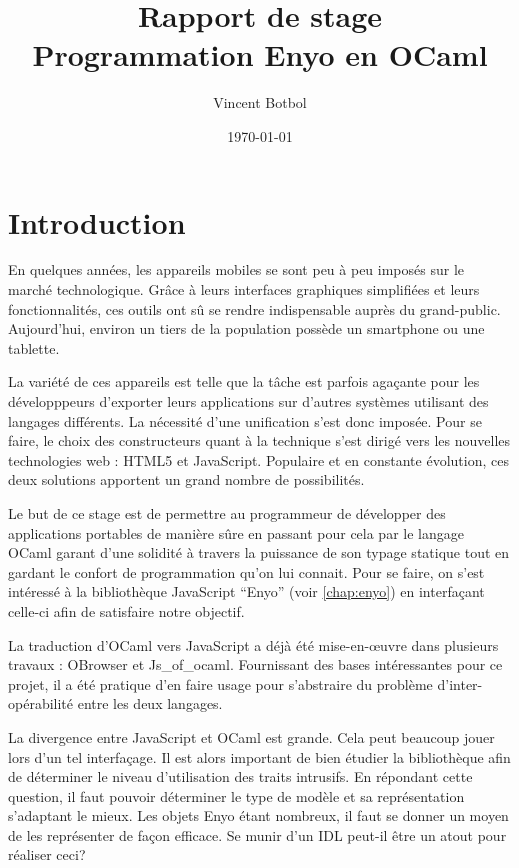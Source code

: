 \documentclass[11pt,a4paper]{report}
\title{Rapport de stage\\Programmation Enyo en OCaml}
\author{Vincent Botbol}
\date\today
\begin{document}
\maketitle

\chapter{Introduction}

En quelques années, les appareils mobiles se sont peu à peu imposés sur le marché technologique.
Grâce à leurs interfaces graphiques simplifiées et leurs fonctionnalités, ces outils ont sû se 
rendre indispensable auprès du grand-public.
Aujourd'hui, environ un tiers de la population possède un smartphone ou une tablette.

La variété de ces appareils est telle que la tâche est parfois agaçante pour les développpeurs 
d'exporter leurs applications sur d'autres systèmes utilisant des langages différents.
La nécessité d'une unification s'est donc imposée. Pour se faire, le choix des constructeurs quant à
la technique s'est dirigé vers les nouvelles technologies web :
HTML5 et JavaScript. Populaire et en constante évolution, ces deux solutions apportent un grand nombre
de possibilités.

Le but de ce stage est de permettre au programmeur de développer des applications portables de manière sûre
en passant pour cela par le langage OCaml garant d'une solidité à travers la puissance de son typage statique
tout en gardant le confort de programmation qu'on lui connait.
Pour se faire, on s'est intéressé à la bibliothèque JavaScript ``Enyo'' (voir \ref{chap:enyo}) 
en interfaçant celle-ci afin de satisfaire notre objectif.

La traduction d'OCaml vers JavaScript a déjà été mise-en-\oe{}uvre dans plusieurs travaux : OBrowser
et Js\_of\_ocaml. Fournissant des bases intéressantes pour ce projet, il a été pratique d'en faire usage
pour s'abstraire du problème d'inter-opérabilité entre les deux langages.

La divergence entre JavaScript et OCaml est grande. Cela peut beaucoup jouer lors d'un tel 
interfaçage. Il est alors important de bien étudier la bibliothèque afin de déterminer le niveau
d'utilisation des traits intrusifs.
En répondant cette question, il faut pouvoir déterminer le type de modèle et sa représentation
s'adaptant le mieux.
Les objets Enyo étant nombreux, il faut se donner un moyen de les représenter 
de façon efficace. Se munir d'un IDL peut-il être un atout pour réaliser ceci?
\end{document}
